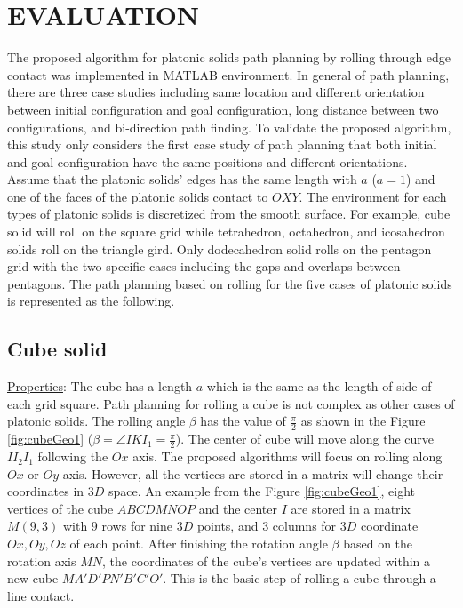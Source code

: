 \section{EVALUATION}
\label{sec:eva}
The proposed algorithm for platonic solids path planning by rolling through edge contact was implemented in MATLAB environment. 
In general of path planning, there are three case studies including same location and different orientation between initial configuration and goal configuration, long distance between two configurations, and bi-direction path finding. To validate the proposed algorithm, this study only considers the first case study of path planning that both initial and goal configuration have the same positions and different orientations.\\  

\noindent Assume that the platonic solids' edges has the same length with $a$ ($a=1$) and one of the faces of the platonic solids contact to $OXY$. The environment for each types of platonic solids is discretized from the smooth surface. For example, cube solid will roll on the square grid while tetrahedron, octahedron, and icosahedron solids roll on the triangle gird. Only dodecahedron solid rolls on the pentagon grid with the two specific cases including the gaps and overlaps between pentagons. The path planning based on rolling for the five cases of platonic solids is represented as the following. 

\subsection{Cube solid}
\noindent\uline{Properties}:
The cube has a length $a$ which is the same as the length of side of each grid square.
Path planning for rolling a cube is not complex as other cases of platonic solids. 
The rolling angle $\beta$ has the value of $\frac{\pi}{2}$ as shown in the Figure \ref{fig:cubeGeo1} ($\beta=\angle{IKI_1}=\frac{\pi}{2}$). 
The center of cube will move along the curve $II_2I_1$ following the $Ox$ axis. 
The proposed algorithms will focus on rolling along $Ox$ or $Oy$ axis. However, all the vertices are stored in a matrix will change their coordinates in $3D$ space. 
An example from the Figure \ref{fig:cubeGeo1}, eight vertices of the cube $ABCDMNOP$ and the center $I$ are stored in a matrix $M(9,3)$ with $9$ rows for nine $3D$ points, and $3$ columns for $3D$ coordinate $Ox,Oy,Oz$ of each point. After finishing the rotation angle $\beta$ based on the rotation axis $MN$, the coordinates of the cube's vertices are updated within a new cube $MA'D'PN'B'C'O'$. This is the basic step of rolling a cube through a line contact.

